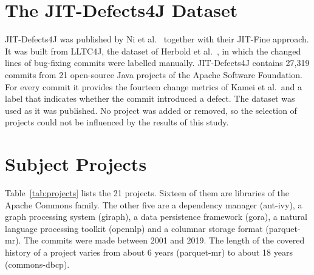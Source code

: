 \documentclass[12pt,a4paper,oneside]{report}
\begin{document}
\section{The JIT-Defects4J Dataset}

JIT-Defects4J was published by Ni et al.~\cite{ni2022jitdefects4j} together
with their JIT-Fine approach. It was built from LLTC4J, the dataset of Herbold
et al.~\cite{herbold2022tangling}, in which the changed lines of bug-fixing
commits were labelled manually. JIT-Defects4J contains 27,319 commits from 21
open-source Java projects of the Apache Software Foundation. For every commit
it provides the fourteen change metrics of Kamei et al.\ and a label that
indicates whether the commit introduced a defect. The dataset was used as it
was published. No project was added or removed, so the selection of projects
could not be influenced by the results of this study.

\section{Subject Projects}

Table~\ref{tab:projects} lists the 21 projects. Sixteen of them are libraries
of the Apache Commons family. The other five are a dependency manager
(ant-ivy), a graph processing system (giraph), a data persistence framework
(gora), a natural language processing toolkit (opennlp) and a columnar storage
format (parquet-mr). The commits were made between 2001 and 2019. The length
of the covered history of a project varies from about 6 years (parquet-mr) to
about 18 years (commons-dbcp).
\end{document}

